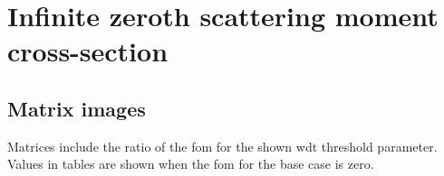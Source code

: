 \begin{landscape}

\newpage
\end{landscape}
\section{Infinite zeroth scattering moment cross-section}
\label{sec:homog_inf_sp0_data}

\subsection{Matrix images}
\label{sec:homog_inf_sp0_mat}
Matrices include the ratio of the \gls{fom} for the shown \gls{wdt}
threshold parameter. Values in tables are shown when the \gls{fom} for
the base case is zero.

